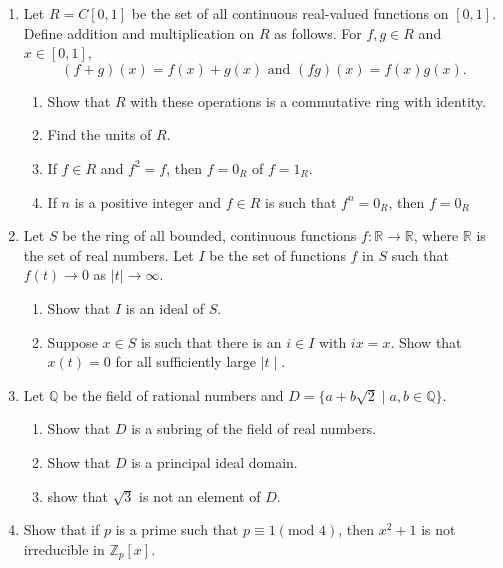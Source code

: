\documentclass{article}
\theoremstyle{definition}
\newcommand{\m}[1]{(\text{mod }{#1})}
\newcommand{\Z}{\mathbb{Z}}
\newcommand{\R}{\mathbb{R}}
\newcommand{\Q}{\mathbb{Q}}
\begin{document}
\begin{enumerate}
            \item Let $R=C[0,1]$ be the set of all continuous real-valued functions on $[0,1]$. Define addition and multiplication on $R$ as follows. For $f,g\in R$ and $x\in [0,1]$, \[(f+g)(x)=f(x)+g(x) \text{ and } (fg)(x)=f(x)g(x).\]
            
            \begin{enumerate}
                \item Show that $R$ with these operations is a commutative ring with identity.
                \item Find the units of $R$.
                \item If $f\in R$ and $f^2=f$, then $f=0_R$ of $f=1_R$.
                \item If $n$ is a positive integer and $f\in R$ is such that $f^n=0_R$, then $f=0_R$
            \end{enumerate}

            \item Let $S$ be the ring of all bounded, continuous functions $f:\R \to \R$, where $\R$ is the set of real numbers. Let $I$ be the set of functions $f$ in $S$ such that $f(t) \to 0$ as $\mid t\mid  \to \infty $.
            
            \begin{enumerate}
                \item Show that $I$ is an ideal of $S$.
                \item Suppose $x\in S$ is such that there is an $i\in I$ with $ix=x$. Show that $x(t)=0$ for all sufficiently large $\mid t\mid $.
            \end{enumerate}

            \item Let $\Q$ be the field of rational numbers and $D=\{a+b\sqrt{2}\mid a,b\in \Q\}$. 
            
            \begin{enumerate}
                \item Show that $D$ is a subring of the field of real numbers.
                \item Show that $D$ is a principal ideal domain.
                \item show that $\sqrt{3}$ is not an element of $D$.
            \end{enumerate}

            \item Show that if $p$ is a prime such that $p\equiv 1 \m{4}$, then $x^2+1$ is not irreducible in $\Z_p[x]$.
            

\end{enumerate}
\end{document}
